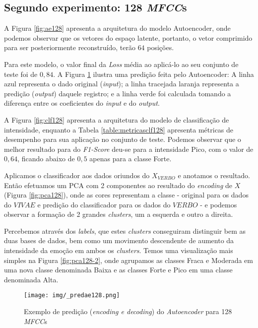 \subsection{Segundo experimento: 128 \textit{MFCC}s}

A Figura \ref{fig:ae128} apresenta a arquitetura do modelo Autoencoder, onde podemos observar que os vetores do espaço latente, portanto, o vetor comprimido para ser posteriormente reconstruído, terão $64$ posições.

Para este modelo, o valor final da \textit{Loss} média ao aplicá-lo ao seu conjunto de teste foi de $0,84$. A Figura \ref{fig:predae128} ilustra uma predição feita pelo Autoencoder: A linha azul representa o dado original (\textit{input}); a linha tracejada laranja representa a predição (\textit{output}) daquele registro; e a linha verde foi calculada tomando a diferença entre os coeficientes do \textit{input} e do \textit{output}.

A Figura \ref{fig:clf128} apresenta a arquitetura do modelo de classificação de intensidade, enquanto a Tabela \ref{table:metricasclf128} apresenta métricas de desempenho para sua aplicação no conjunto de teste. Podemos observar que o melhor resultado para do \textit{F1-Score} deu-se para a intensidade Pico, com o valor de $0,64$, ficando abaixo de $0,5$ apenas para a classe Forte.

Aplicamos o classificador aos dados oriundos do $X_{VERBO}$ e anotamos o resultado. Então efetuamos um \acrshort{PCA} com 2 componentes ao resultado do \textit{encoding} de $X$ (Figura \ref{fig:pca128}), onde as cores representam a classe - original para os dados do $VIVAE$ e predição do classificador para os dados do $VERBO$ - e podemos observar a formação de 2 grandes \textit{clusters}, um a esquerda e outro a direita.

Percebemos através dos \textit{labels}, que estes \textit{clusters} conseguiram distinguir bem as duas bases de dados, bem como um movimento descendente de aumento da intensidade da emoção em ambos os \textit{clusters}. Temos uma visualização mais simples na Figura \ref{fig:pca128-2}, onde agrupamos as classes Fraca e Moderada em uma nova classe denominada Baixa e as classes Forte e Pico em uma classe denominada Alta.

    \begin{figure}%
    \centering
    \texttt{[image: img/\_predae128.png]}
    \caption{\label{fig:predae128}Exemplo de predição (\textit{encoding e decoding}) do \textit{Autoencoder} para 128 \textit{MFCC}s}
\end{figure}

